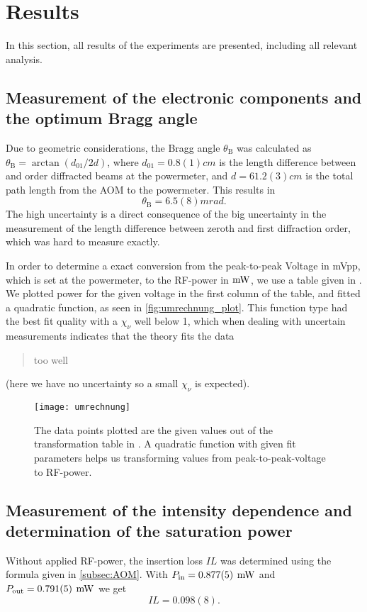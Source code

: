 \section{Results}
In this section, all results of the experiments are presented, including all relevant analysis. 
\subsection{Measurement of the electronic
	components and the optimum Bragg
	angle}\label{bragg_angle_berechnung}

Due to geometric considerations, the Bragg angle $\theta_{\mathrm{B}}$ was calculated as $\theta_{\mathrm{B}} = \arctan(d_{01}/2d)$, where $d_{01} = 0.8(1) \unit{cm}$ is the length difference between  and  order diffracted beams at the powermeter, and $d = 61.2(3) \unit{cm}$ is the total path length from the AOM to the powermeter. This results in
$$\theta_{\mathrm{B}} = 6.5(8) \unit{mrad}.$$ 
The high uncertainty is a direct consequence of the big uncertainty in the measurement of the length difference between zeroth and first diffraction order, which was hard to measure exactly. \newline

In order to determine a exact conversion from the peak-to-peak Voltage in mVpp, which is set at the powermeter, to the RF-power in $\oldunit{mW}$, we use a table given in \autocite{UmrechnungsTabelleDB}. We plotted power for the given voltage in the first column of the table, and fitted a quadratic function, as seen in \autoref{fig:umrechnung_plot}. This function type had the best fit quality  with a $\chi_\nu$ well below 1, which when dealing with uncertain measurements indicates that the theory fits the data \blockquote{too well} (here we have no uncertainty so a small $\chi_\nu$ is expected).
\begin{figure}[H]
	\centering
	\texttt{[image: umrechnung]}
	\caption{The data points plotted are the given values out of the transformation table in \autocite{UmrechnungsTabelleDB}. A quadratic function with given fit parameters helps us transforming values from peak-to-peak-voltage to RF-power. }
	\label{fig:umrechnung_plot}
\end{figure}

\subsection{Measurement of the intensity dependence and determination of the saturation power}
Without applied RF-power, the insertion loss $IL$ was determined using the formula given in \autoref{subsec:AOM}. With $\P{in}= 0.877(5) \unit{mW}$ and $\P{out} = 0.791(5) \unit{mW}$ we get
$$IL = 0.098(8).$$

